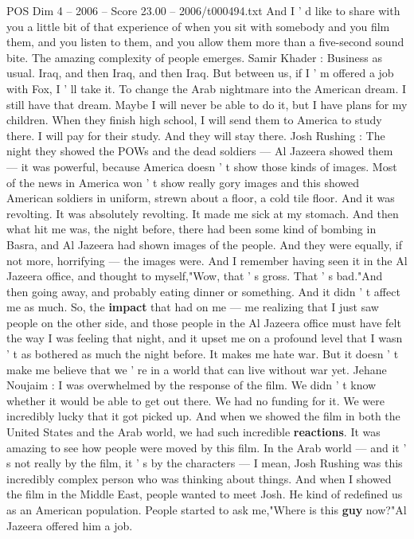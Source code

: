 \begin{textsample}{POS Dim 4 – 2006 – Score 23.00 – 2006/t000494.txt}
And I ' d like to share with you a little bit of that experience of when you sit with somebody and you film them, and you listen to them, and you allow them more than a five-second sound bite.
The amazing complexity of people emerges.
Samir Khader : Business as usual.
Iraq, and then Iraq, and then Iraq.
But between us, if I ' m offered a job with Fox, I ' ll take it.
To change the Arab nightmare into the American dream.
I still have that dream.
Maybe I will never be able to do it, but I have plans for my children.
When they finish high school, I will send them to America to study there.
I will pay for their study.
And they will stay there.
Josh Rushing : The night they showed the POWs and the dead soldiers — Al Jazeera showed them — it was powerful, because America doesn ' t show those kinds of images.
Most of the news in America won ' t show really gory images and this showed American soldiers in uniform, strewn about a floor, a cold tile floor.
And it was revolting.
It was absolutely revolting.
It made me sick at my stomach.
And then what hit me was, the night before, there had been some kind of bombing in Basra, and Al Jazeera had shown images of the people.
And they were equally, if not more, horrifying — the images were.
And I remember having seen it in the Al Jazeera office, and thought to myself,"Wow, that ' s gross.
That ' s bad."And then going away, and probably eating dinner or something.
And it didn ' t affect me as much.
So, the \textbf{impact} that had on me — me realizing that I just saw people on the other side, and those people in the Al Jazeera office must have felt the way I was feeling that night, and it upset me on a profound level that I wasn ' t as bothered as much the night before.
It makes me hate war.
But it doesn ' t make me believe that we ' re in a world that can live without war yet.
Jehane Noujaim : I was overwhelmed by the response of the film.
We didn ' t know whether it would be able to get out there.
We had no funding for it.
We were incredibly lucky that it got picked up.
And when we showed the film in both the United States and the Arab world, we had such incredible \textbf{reactions}.
It was amazing to see how people were moved by this film.
In the Arab world — and it ' s not really by the film, it ' s by the characters — I mean, Josh Rushing was this incredibly complex person who was thinking about things.
And when I showed the film in the Middle East, people wanted to meet Josh.
He kind of redefined us as an American population.
People started to ask me,"Where is this \textbf{guy} now?"Al Jazeera offered him a job.

\end{textsample}
